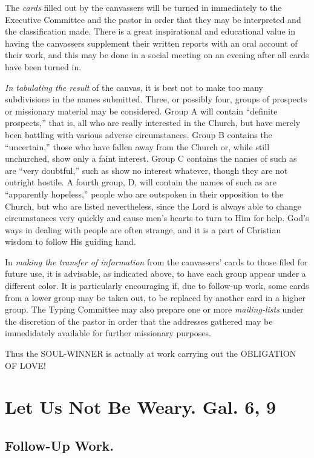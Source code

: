 \documentclass[
]{book}
\begin{document}
The \emph{cards} filled out by the canvassers will be turned in immediately to the Executive Committee and the pastor in order that they may be interpreted and the classification made. There is a great inspirational and educational value in having the canvassers supplement their written reports with an oral account of their work, and this may be done in a social meeting on an evening after all cards have been turned in.

\emph{In tabulating the result} of the canvas, it is best not to make too many subdivisions in the names submitted. Three, or possibly four, groups of prospects or missionary material may be considered. Group A will contain ``definite prospects,'' that is, all who are really interested in the Church, but have merely been battling with various adverse circumstances. Group B contains the ``uncertain,'' those who have fallen away from the Church or, while still unchurched, show only a faint interest. Group C contains the names of such as are ``very doubtful,'' such as show no interest whatever, though they are not outright hostile. A fourth group, D, will contain the names of such as are ``apparently hopeless,'' people who are outspoken in their opposition to the Church, but who are listed nevertheless, since the Lord is always able to change circumstances very quickly and cause men's hearts to turn to Him for help. God's ways in dealing with people are often strange, and it is a part of Christian wisdom to follow His guiding hand.

In \emph{making the transfer of information} from the canvassers' cards to those filed for future use, it is advisable, as indicated above, to have each group appear under a different color. It is particularly encouraging if, due to follow-up work, some cards from a lower group may be taken out, to be replaced by another card in a higher group. The Typing Committee may also prepare one or more \emph{mailing-lists} under the discretion of the pastor in order that the addresses gathered may be immedidately available for further missionary purposes.

Thus the SOUL-WINNER is actually at work carrying out the OBLIGATION OF LOVE!

\hypertarget{let-us-not-be-weary.-gal.-6-9}{%
\chapter{Let Us Not Be Weary. Gal. 6, 9}\label{let-us-not-be-weary.-gal.-6-9}}

\hypertarget{follow-up-work.}{%
\section*{Follow-Up Work.}\label{follow-up-work.}}
\end{document}
